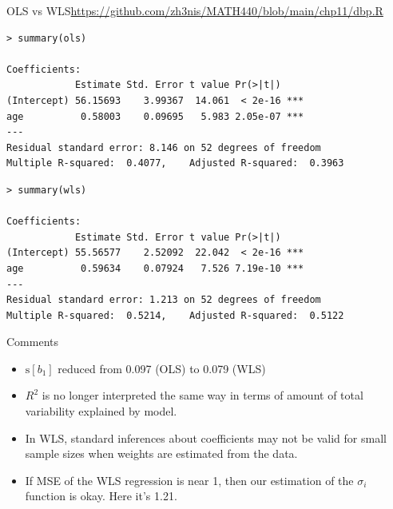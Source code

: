 \documentclass{beamer}
\newcommand{\s}{\mathrm{s}}
\begin{document}
\begin{frame}[fragile]{OLS vs WLS}{\url{https://github.com/zh3nis/MATH440/blob/main/chp11/dbp.R}}
\begin{footnotesize}
\begin{verbatim}
> summary(ols)

Coefficients:
            Estimate Std. Error t value Pr(>|t|)    
(Intercept) 56.15693    3.99367  14.061  < 2e-16 ***
age          0.58003    0.09695   5.983 2.05e-07 ***
---
Residual standard error: 8.146 on 52 degrees of freedom
Multiple R-squared:  0.4077,	Adjusted R-squared:  0.3963 
\end{verbatim}
\pause\begin{verbatim}
> summary(wls)

Coefficients:
            Estimate Std. Error t value Pr(>|t|)    
(Intercept) 55.56577    2.52092  22.042  < 2e-16 ***
age          0.59634    0.07924   7.526 7.19e-10 ***
---
Residual standard error: 1.213 on 52 degrees of freedom
Multiple R-squared:  0.5214,	Adjusted R-squared:  0.5122 
\end{verbatim}
\end{footnotesize}
\end{frame}

\begin{frame}{Comments}
\begin{itemize}
    \item $\s[b_1]$ reduced from 0.097 (OLS) to 0.079 (WLS)
    \item<2-> $R^2$ is no longer interpreted the same way in terms of amount of total variability explained by model.
    \item<3-> In WLS, standard inferences about coefficients may not be valid for small sample sizes when weights are estimated from the data.
    \item<4-> If MSE of the WLS regression is near 1, then our estimation of the $\sigma_i$ function is okay. Here it's 1.21. 
\end{itemize}
\end{frame}
\end{document}
